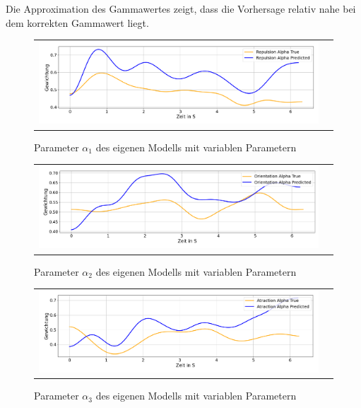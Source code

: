 Die Approximation des Gammawertes zeigt, dass die Vorhersage relativ nahe bei dem korrekten Gammawert liegt.

\begin{figure}[H]
\centering
\begin{tabular}{cc}
\includegraphics[width=1.0\textwidth]{figures/Experimente/Parameter_variabel/PWD_R.png} 
\end{tabular}
\caption{Parameter $\alpha_1$  des eigenen Modells mit variablen Parametern \label{fig:PWD_PV_R}}
\end{figure}

\begin{figure}[H]
\centering
\begin{tabular}{cc}
\includegraphics[width=1.0\textwidth]{figures/Experimente/Parameter_variabel/PWD_O.png} 
\end{tabular}
\caption{Parameter $\alpha_2$  des eigenen Modells mit variablen Parametern \label{fig:PWD_PV_O}}
\end{figure}

\begin{figure}[H]
\centering
\begin{tabular}{cc}
\includegraphics[width=1.0\textwidth]{figures/Experimente/Parameter_variabel/PWD_A.png} 
\end{tabular}
\caption{Parameter $\alpha_3$  des eigenen Modells mit variablen Parametern \label{fig:PWD_PV_A}}
\end{figure}

